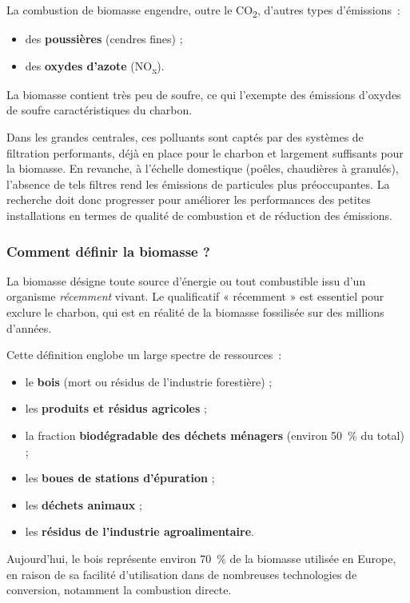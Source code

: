 La combustion de biomasse engendre, outre le CO\textsubscript{2}, d'autres types d'émissions~:
\begin{itemize}
    \item des \textbf{poussières} (cendres fines) ;
    \item des \textbf{oxydes d'azote} (NO\textsubscript{x}).
\end{itemize}

La biomasse contient très peu de soufre, ce qui l'exempte des émissions d'oxydes de soufre caractéristiques du charbon.

Dans les grandes centrales, ces polluants sont captés par des systèmes de filtration performants, déjà en place pour le charbon et largement suffisants pour la biomasse. En revanche, à l'échelle domestique (poêles, chaudières à granulés), l'absence de tels filtres rend les émissions de particules plus préoccupantes. La recherche doit donc progresser pour améliorer les performances des petites installations en termes de qualité de combustion et de réduction des émissions.

\subsubsection{Comment définir la biomasse ?}

La biomasse désigne toute source d'énergie ou tout combustible issu d'un organisme \textit{récemment} vivant. Le qualificatif « récemment » est essentiel pour exclure le charbon, qui est en réalité de la biomasse fossilisée sur des millions d'années.

Cette définition englobe un large spectre de ressources~:
\begin{itemize}
    \item le \textbf{bois} (mort ou résidus de l'industrie forestière) ;
    \item les \textbf{produits et résidus agricoles} ;
    \item la fraction \textbf{biodégradable des déchets ménagers} (environ 50~\% du total) ;
    \item les \textbf{boues de stations d'épuration} ;
    \item les \textbf{déchets animaux} ;
    \item les \textbf{résidus de l'industrie agroalimentaire}.
\end{itemize}

Aujourd'hui, le bois représente environ 70~\% de la biomasse utilisée en Europe, en raison de sa facilité d'utilisation dans de nombreuses technologies de conversion, notamment la combustion directe.

